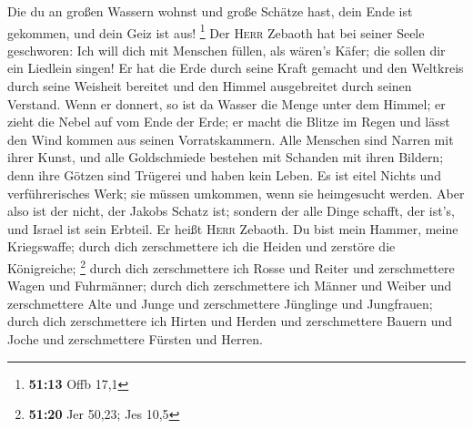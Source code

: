  Die du an großen Wassern wohnst und große Schätze hast,
dein Ende ist gekommen, und dein Geiz ist aus! \footnote{\textbf{51:13}
  Offb 17,1}  Der \textsc{Herr} Zebaoth hat bei seiner
Seele geschworen: Ich will dich mit Menschen füllen, als wären's Käfer;
die sollen dir ein Liedlein singen!  Er hat die Erde
durch seine Kraft gemacht und den Weltkreis durch seine Weisheit
bereitet und den Himmel ausgebreitet durch seinen Verstand.
 Wenn er donnert, so ist da Wasser die Menge unter dem
Himmel; er zieht die Nebel auf vom Ende der Erde; er macht die Blitze im
Regen und lässt den Wind kommen aus seinen Vorratskammern.
 Alle Menschen sind Narren mit ihrer Kunst, und alle
Goldschmiede bestehen mit Schanden mit ihren Bildern; denn ihre Götzen
sind Trügerei und haben kein Leben.  Es ist eitel Nichts
und verführerisches Werk; sie müssen umkommen, wenn sie heimgesucht
werden.  Aber also ist der nicht, der Jakobs Schatz ist;
sondern der alle Dinge schafft, der ist's, und Israel ist sein Erbteil.
Er heißt \textsc{Herr} Zebaoth.  Du bist mein Hammer,
meine Kriegswaffe; durch dich zerschmettere ich die Heiden und zerstöre
die Königreiche; \footnote{\textbf{51:20} Jer 50,23; Jes 10,5}
 durch dich zerschmettere ich Rosse und Reiter und
zerschmettere Wagen und Fuhrmänner;  durch dich
zerschmettere ich Männer und Weiber und zerschmettere Alte und Junge und
zerschmettere Jünglinge und Jungfrauen;  durch dich
zerschmettere ich Hirten und Herden und zerschmettere Bauern und Joche
und zerschmettere Fürsten und Herren.

